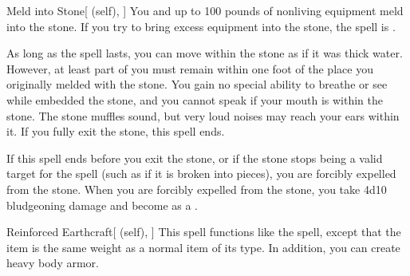 \lowercase{\hypertarget{spell:Meld into Stone}{}}\label{spell:Meld into Stone}
\begin{attuneability}[\nth{2}]{\hypertarget{spell:Meld into Stone}{Meld into Stone}}[ (self), ]
You and up to 100 pounds of nonliving equipment meld into the stone.
If you try to bring excess equipment into the stone, the spell is .

As long as the spell lasts, you can move within the stone as if it was thick water.
However, at least part of you must remain within one foot of the place you originally melded with the stone.
You gain no special ability to breathe or see while embedded the stone, and you cannot speak if your mouth is within the stone.
The stone muffles sound, but very loud noises may reach your ears within it.
If you fully exit the stone, this spell ends.

If this spell ends before you exit the stone, or if the stone stops being a valid target for the spell (such as if it is broken into pieces), you are forcibly expelled from the stone.
When you are forcibly expelled from the stone, you take 4d10 bludgeoning damage and become  as a .
\end{attuneability}
\vspace{0.25em}



\lowercase{\hypertarget{spell:Reinforced Earthcraft}{}}\label{spell:Reinforced Earthcraft}
\begin{attuneability}[\nth{2}]{\hypertarget{spell:Reinforced Earthcraft}{Reinforced Earthcraft}}[ (self), ]
This spell functions like the  spell, except that the item is the same weight as a normal item of its type.
In addition, you can create heavy body armor.
\end{attuneability}
\vspace{0.25em}



